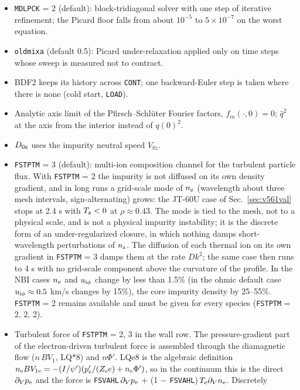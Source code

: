 \documentclass[11pt]{article}
\def\r#1{{\rm#1}}
\def\nee{n_\r{e}}
\begin{document}
\begin{itemize}
\item \texttt{MDLPCK} = 2 (default): block-tridiagonal solver with one step of
  iterative refinement; the Picard floor falls from about $10^{-5}$ to
  $5\times10^{-7}$ on the worst equation.
\item \texttt{oldmixa} (default 0.5): Picard under-relaxation applied only on
  time steps whose sweep is measured not to contract.
\item BDF2 keeps its history across \texttt{CONT}; one backward-Euler step is
  taken where there is none (cold start, \texttt{LOAD}).
\item Analytic axis limit of the Pfirsch--Schl\"uter Fourier factors,
  $f_m(\cdot,0) = 0$; $\hat q^2$ at the axis from the interior instead of $q(0)^2$.
\item $D_{0\r{z}}$ uses the impurity neutral speed $V_{0z}$.
\item \texttt{FSTPTM} = 3 (default): multi-ion composition channel for the
  turbulent particle flux.  With \texttt{FSTPTM} = 2 the impurity is not diffused on
  its own density gradient, and in long runs a grid-scale mode of $n_\r{z}$ (wavelength
  about three mesh intervals, sign-alternating) grows: the JT-60U case of
  Sec.~\ref{sec:v561val} stops at 2.4 s with $T_\r{z} < 0$ at $\rho \approx 0.43$.  The mode
  is tied to the mesh, not to a physical scale, and is not a physical impurity
  instability; it is the discrete form of an under-regularized closure, in which nothing
  damps short-wavelength perturbations of $n_\r{z}$.  The diffusion of each thermal ion on
  its own gradient in \texttt{FSTPTM} = 3 damps them at the rate $D k^2$; the same case then
  runs to 4 s with no grid-scale component above the curvature of the profile.  In the NBI cases $\nee$ and $u_{\r{i}\phi}$ change
  by less than 1.5\% (in the ohmic default case $u_{\r{i}\phi} \approx 0.5$ km/s changes by
  15\%), the core impurity density by 25--55\%.  \texttt{FSTPTM} = 2 remains
  available and must be given for every species (\texttt{FSTPTM} = 2, 2, 2).
\item Turbulent force of \texttt{FSTPTM} = 2, 3 in the wall row.  The pressure-gradient part
  of the electron-driven turbulent force is assembled through the diamagnetic flow
  ($n\,BV_1$, LQ*8) and $n\Phi'$.  LQe8 is the algebraic definition
  $n_\r{e}BV_{1\r{e}} = -(I/\psi')(p_\r{e}'/(Z_\r{e}e) + n_\r{e}\Phi')$, so in the continuum this is
  the direct $\partial_V p_\r{e}$ and the force is
  \texttt{FSVAHL}\,$\partial_V p_\r{e}$ + (1 $-$ \texttt{FSVAHL})\,$T_\r{e}\partial_V\nee$.  Discretely

\end{itemize}
\end{document}
